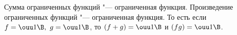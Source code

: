 
 	Сумма ограниченных функций "--- ограниченная функция. Произведение ограниченных функций "--- ограниченная функция.
 	То есть если $f=\ouu1\B,\ g=\ouu1\B$, то $(f+g)=\ouu1\B$ и $(fg)=\ouu1\B$.
 
